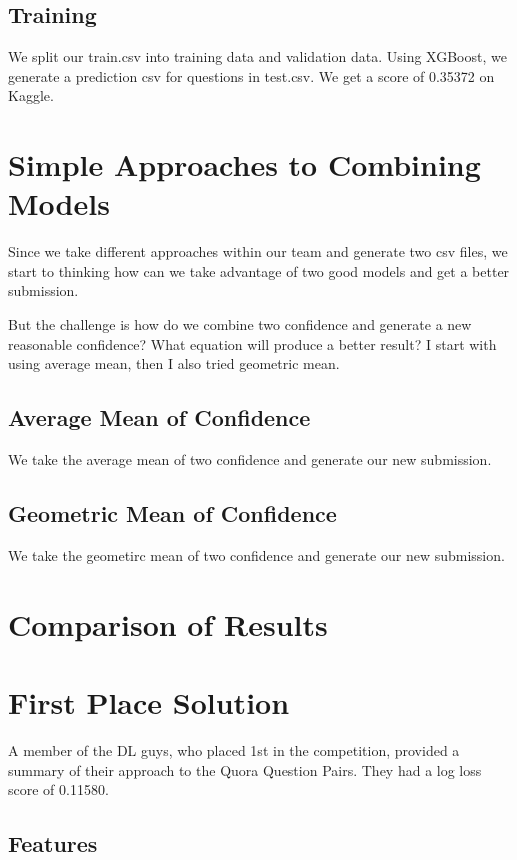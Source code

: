 \documentclass{article}
\begin{document}
\subsection{Training}

We split our train.csv into training data and validation data. Using XGBoost, we generate a prediction csv for questions in test.csv. We get a score of 0.35372 on Kaggle.

\section{Simple Approaches to Combining Models}

Since we take different approaches within our team and generate two csv files, we start to thinking how can we take advantage of two good models and get a better submission. 

But the challenge is how do we combine two confidence and generate a new reasonable confidence? What equation will produce a better result? I start with using average mean, then I also tried geometric mean. 
 

\subsection{Average Mean of Confidence}

We take the average mean of two confidence and generate our new submission. 

\subsection{Geometric Mean of Confidence}

We take the geometirc mean of two confidence and generate our new submission. 

\section{Comparison of Results}

\section{First Place Solution}

A member of the DL guys, who placed 1st in the competition, provided a summary
of their approach to the Quora Question Pairs. They had a log loss score of
0.11580.

\subsection{Features}
\end{document}
